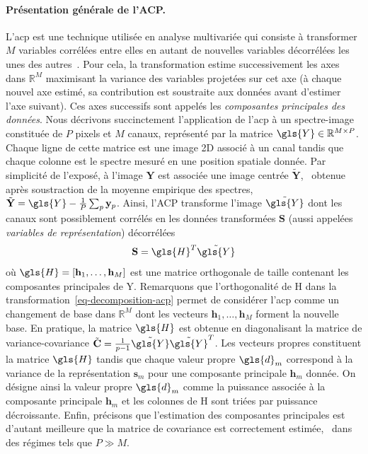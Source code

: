     \paragraph{Présentation générale de l'ACP.} L'\gls{acp} est une technique utilisée en analyse multivariée qui consiste à transformer $M$ variables corrélées entre elles en autant de nouvelles variables décorrélées les unes des autres~\cite{jolliffe2002springer}. Pour cela, la transformation estime successivement les axes dans $\mathbb{R}^M$ maximisant la variance des variables projetées sur cet axe (à chaque nouvel axe estimé, sa contribution est soustraite aux données avant d'estimer l'axe suivant). Ces axes successifs sont appelés les \emph{composantes principales des données}.
    Nous décrivons succinctement l'application de l'\gls{acp} à un spectre-image constituée de $P$ pixels et $M$ canaux, représenté par la matrice $\gls{Y} \in \mathbb{R}^{M\times P}$. Chaque ligne de cette matrice est une image 2D associé à un canal tandis que chaque colonne est le spectre mesuré en une position spatiale donnée.
    Par simplicité de l'exposé, à l'image $\mathbf{Y}$ est associée une image centrée $\tilde{\mathbf{Y}}$, \ie\ obtenue après soustraction de la moyenne empirique des spectres, $\tilde{\mathbf{Y}}=\gls{Y}-\frac{1}{P}\sum_p\mathbf{y}_p$.
    Ainsi, l'ACP transforme l'image $\tilde{\gls{Y}}$ dont les canaux sont possiblement corrélés en les données transformées $\mathbf{S}$ (aussi appelées \emph{variables de représentation}) décorrélées
    \begin{equation}\label{eq-decomposition-acp}
    \mathbf{S} = \gls{H}^T\tilde{\gls{Y}}
    \end{equation}
    où $\gls{H} = [\mathbf{h}_1,\dots,\mathbf{h}_M]$ est une matrice orthogonale de taille  contenant les composantes principales de \gls{Y}. Remarquons que l'orthogonalité de \gls{H} dans la transformation~\eqref{eq-decomposition-acp} permet de considérer l'\gls{acp} comme un changement de base dans $\mathbb{R}^M$ dont les vecteurs $\mathbf{h}_1,\dots,\mathbf{h}_M$ forment la nouvelle base. 
    En pratique, la matrice $\gls{H}$ est obtenue en diagonalisant la matrice de variance-covariance $\tilde{\mathbf{C}} = \frac{1}{p-1}\tilde{\gls{Y}}\tilde{\gls{Y}}^T$. Les vecteurs propres constituent la matrice $\gls{H}$ tandis que chaque valeur propre $\gls{d}_m$ correspond à la variance de la représentation $\mathbf{s}_m$ pour une composante principale $\mathbf{h}_m$ donnée. On désigne ainsi la valeur propre $\gls{d}_m$ comme la puissance associée à la composante principale $\mathbf{h}_m$ et les colonnes de \gls{H} sont triées par puissance décroissante. 
    Enfin, précisons que l'estimation des composantes principales est d'autant meilleure que la matrice de covariance est correctement estimée, \ie\ dans des régimes tels que $P\gg M$.

